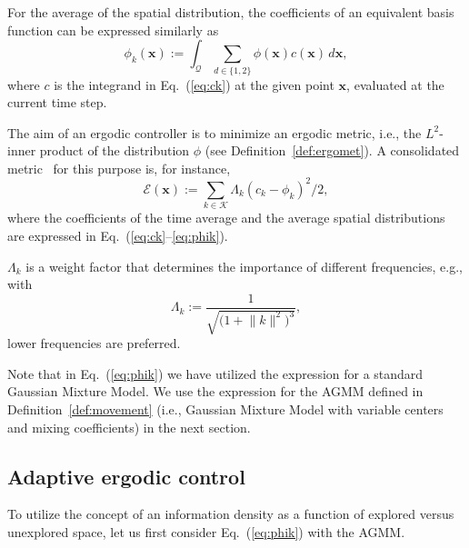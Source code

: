 \documentclass[letterpaper, 10 pt, conference, twoside]{IEEEtran}
\theoremstyle{definition}
\begin{document}
For the average of the spatial distribution, the coefficients of an equivalent basis function can be expressed similarly as 
\begin{equation}\label{eq:phik}
  \phi_k(\mathbf{x}):=\int_{\mathcal{Q}}{\sum_{d\in\{1,2\}}}{\phi(\mathbf{x})c(\mathbf{x})\,d\mathbf{x}},
\end{equation}
where $c$ is the integrand in Eq.~(\ref{eq:ck}) at the given point $\mathbf{x}$, evaluated at the current time step.

The aim of an ergodic controller is to minimize an ergodic metric, i.e., the $L^2$-inner product of the distribution $\phi$ (see Definition~\ref{def:ergomet}). A consolidated metric~\cite{abraham2017ergodic,abraham2021ergodic,dong2023time} for this purpose is, for instance, \begin{equation}
  \mathcal{E}(\mathbf{x}):=\sum_{k\in\mathcal{K}}{\Lambda_k(c_k-\phi_k)^2/2},
\end{equation}
where the coefficients of the time average and the average spatial distributions are expressed in Eq.~(\ref{eq:ck}--\ref{eq:phik}).

$\Lambda_k$ is a weight factor that determines the importance of different frequencies, e.g., with
\begin{equation}
  \Lambda_k:=\frac{1}{\sqrt{\big(1+\lVert{k}\rVert^2\big)^3}},
\end{equation}
lower frequencies are preferred.

Note that in Eq.~(\ref{eq:phik}) we have utilized the expression for a standard Gaussian Mixture Model. 
We use the expression for the AGMM defined in Definition~\ref{def:movement} (i.e., Gaussian Mixture Model with variable centers and mixing coefficients) in the next section.


\subsection{Adaptive ergodic control}
\label{sec:sol}
\noindent
To utilize the concept of an information density as a function of explored versus unexplored space, let us first consider Eq.~(\ref{eq:phik}) with the AGMM.
\end{document}
